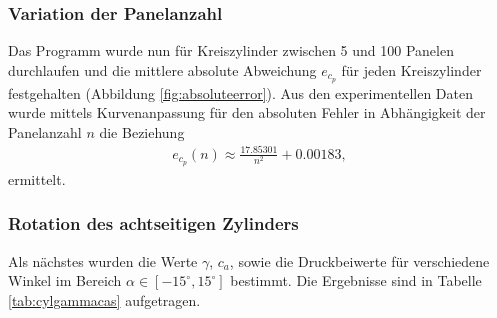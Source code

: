\subsubsection{Variation der Panelanzahl}
Das Programm wurde nun für Kreiszylinder zwischen 5 und 100 Panelen durchlaufen und die mittlere absolute Abweichung $e_{c_p}$ für jeden Kreiszylinder festgehalten (Abbildung \ref{fig:absoluteerror}). Aus den experimentellen Daten wurde mittels Kurvenanpassung für den absoluten Fehler in Abhängigkeit der Panelanzahl $n$ die Beziehung 
\begin{align*}
e_{c_{p}}(n) \approx \frac{17.85301}{n^2} + 0.00183,
\end{align*}
ermittelt.

\subsubsection{Rotation des achtseitigen Zylinders}
Als nächstes wurden die Werte $\gamma$, $c_a$, sowie die Druckbeiwerte für verschiedene Winkel im Bereich $\alpha \in [-15^{\circ}, 15^{\circ}]$ bestimmt. Die Ergebnisse sind in Tabelle \ref{tab:cylgammacas} aufgetragen. 

